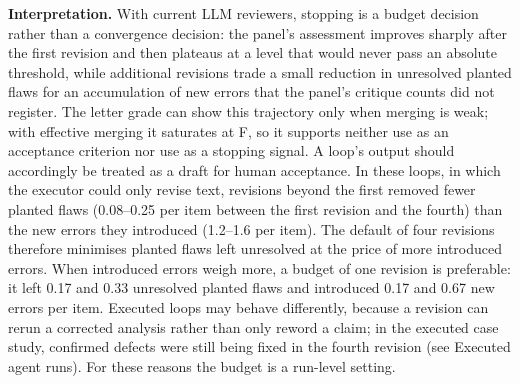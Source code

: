\textbf{Interpretation.} With current LLM reviewers, stopping is a budget decision rather than a convergence decision: the panel's assessment improves sharply after the first revision and then plateaus at a level that would never pass an absolute threshold, while additional revisions trade a small reduction in unresolved planted flaws for an accumulation of new errors that the panel's critique counts did not register. The letter grade can show this trajectory only when merging is weak; with effective merging it saturates at F, so it supports neither use as an acceptance criterion nor use as a stopping signal. A loop's output should accordingly be treated as a draft for human acceptance. In these loops, in which the executor could only revise text, revisions beyond the first removed fewer planted flaws (0.08--0.25 per item between the first revision and the fourth) than the new errors they introduced (1.2--1.6 per item). The default of four revisions therefore minimises planted flaws left unresolved at the price of more introduced errors. When introduced errors weigh more, a budget of one revision is preferable: it left 0.17 and 0.33 unresolved planted flaws and introduced 0.17 and 0.67 new errors per item. Executed loops may behave differently, because a revision can rerun a corrected analysis rather than only reword a claim; in the executed case study, confirmed defects were still being fixed in the fourth revision (see Executed agent runs). For these reasons the budget is a run-level setting.
